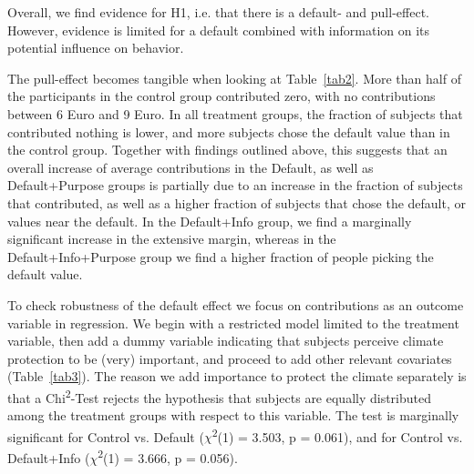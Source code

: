 \documentclass[review, authoryear,12pt]{elsarticle}
\begin{document}
Overall, we find evidence for H1, i.e. that there is a default- and pull-effect. However, evidence is limited for a default combined with information on its potential influence on behavior.

The pull-effect becomes tangible when looking at Table~\ref{tab2}. More than half of the participants in the control group contributed zero, with no contributions between 6 Euro and 9 Euro. In all treatment groups, the fraction of subjects that contributed nothing is lower, and more subjects chose the default value than in the control group. Together with findings outlined above, this suggests that an overall increase of average contributions in the Default, as well as Default+Purpose groups is partially due to an increase in the fraction of subjects that contributed, as well as a higher fraction of subjects that chose the default, or values near the default. In the Default+Info group, we find a marginally significant increase in the extensive margin, whereas in the Default+Info+Purpose group we find a higher fraction of people picking the default value.

To check robustness of the default effect we focus on contributions as an outcome variable in regression. We begin with a restricted model limited to the treatment variable, then add a dummy variable indicating that subjects perceive climate protection to be (very) important, and proceed to add other relevant covariates (Table~\ref{tab3}). The reason we add importance to protect the climate separately is that a Chi\textsuperscript{2}-Test rejects the hypothesis that subjects are equally distributed among the treatment groups with respect to this variable. The test is marginally significant for Control vs. Default ($\chi$\textsuperscript{2}(1) = 3.503, p = 0.061), and for Control vs. Default+Info ($\chi$\textsuperscript{2}(1) = 3.666, p = 0.056).
\end{document}
